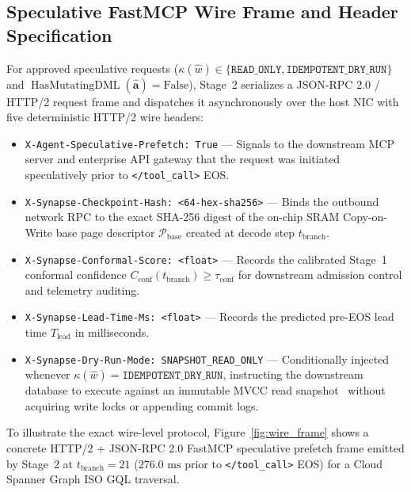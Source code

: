 \documentclass[10pt,conference]{IEEEtran}
\begin{document}
\subsection{Speculative FastMCP Wire Frame and Header Specification}
For approved speculative requests ($\kappa(\hat{w}) \in \{\texttt{READ\_ONLY}, \texttt{IDEMPOTENT\_DRY\_RUN}\}$ and $\operatorname{HasMutatingDML}(\hat{\mathbf{a}}) = \text{False}$), Stage~2 serializes a JSON-RPC 2.0 / HTTP/2 request frame and dispatches it asynchronously over the host NIC with five deterministic HTTP/2 wire headers:
\begin{itemize}
    \item \texttt{X-Agent-Speculative-Prefetch: True} --- Signals to the downstream MCP server and enterprise API gateway that the request was initiated speculatively prior to \texttt{</tool\_call>} EOS.
    \item \texttt{X-Synapse-Checkpoint-Hash: <64-hex-sha256>} --- Binds the outbound network RPC to the exact SHA-256 digest of the on-chip SRAM Copy-on-Write base page descriptor $\mathcal{P}_{\text{base}}$ created at decode step $t_{\text{branch}}$.
    \item \texttt{X-Synapse-Conformal-Score: <float>} --- Records the calibrated Stage~1 conformal confidence $C_{\text{conf}}(t_{\text{branch}}) \ge \tau_{\text{conf}}$ for downstream admission control and telemetry auditing.
    \item \texttt{X-Synapse-Lead-Time-Ms: <float>} --- Records the predicted pre-EOS lead time $T_{\text{lead}}$ in milliseconds.
    \item \texttt{X-Synapse-Dry-Run-Mode: SNAPSHOT\_READ\_ONLY} --- Conditionally injected whenever $\kappa(\hat{w}) = \texttt{IDEMPOTENT\_DRY\_RUN}$, instructing the downstream database to execute against an immutable MVCC read snapshot~\cite{corbett2012spanner} without acquiring write locks or appending commit logs.
\end{itemize}

To illustrate the exact wire-level protocol, Figure~\ref{fig:wire_frame} shows a concrete HTTP/2 + JSON-RPC 2.0 FastMCP speculative prefetch frame emitted by Stage~2 at $t_{\text{branch}} = 21$ ($276.0\text{ ms}$ prior to \texttt{</tool\_call>} EOS) for a Cloud Spanner Graph ISO GQL traversal.
\end{document}
